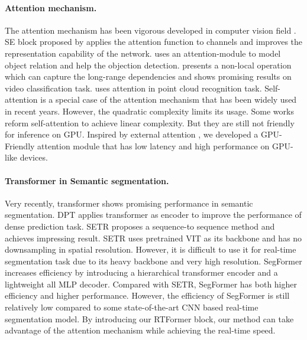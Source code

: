\documentclass{article}
\begin{document}
\vspace{-2mm}
\paragraph{Attention mechanism.}
The attention mechanism has been vigorous developed in computer vision field \cite{wang2018non,yuan2018ocnet,hu2018relation,hu2018squeeze,fu2019dual,xie2018attentional}. SE block proposed by \cite{hu2018squeeze} applies the attention function to channels and improves the representation capability of the network. \cite{hu2018relation} uses an attention-module to model object relation and help the objection detection. \cite{wang2018non} presents a non-local operation which can capture the long-range dependencies and shows promising results on video classification task. \cite{xie2018attentional} uses attention in point cloud recognition task. Self-attention is a special case of the attention mechanism that has been widely used in recent years\cite{yuan2018ocnet, fu2019dual, wang2020hierarchical}. However, the quadratic complexity limits its usage. Some works\cite{guo2021beyond, wang2020linformer, xiong2021nystromformer} reform self-attention to achieve linear complexity. But they are still not friendly for inference on GPU. Inspired by external attention \cite{guo2021beyond}, we developed a GPU-Friendly attention module that has low latency and high performance on GPU-like devices.

\vspace{-2mm}
\paragraph{Transformer in Semantic segmentation.}
Very recently, transformer shows promising performance in semantic segmentation. DPT \cite{ranftl2021vision} applies transformer as encoder to improve the performance of dense prediction task. SETR \cite{zheng2021rethinking} proposes a sequence-to sequence method and achieves impressing result. SETR uses pretrained VIT \cite{vit-G} as its backbone and has no downsampling in spatial resolution. However, it is difficult to use it for real-time segmentation task due to its heavy backbone and very high resolution. SegFormer \cite{xie2021segformer} increases efficiency by introducing a hierarchical transformer encoder and a lightweight all MLP decoder. Compared with SETR, SegFormer has both higher efficiency and higher performance. However, the efficiency of SegFormer is still relatively low compared to some state-of-the-art CNN based real-time segmentation model. By introducing our RTFormer block, our method can take advantage of the attention mechanism while achieving the real-time speed.
\end{document}
